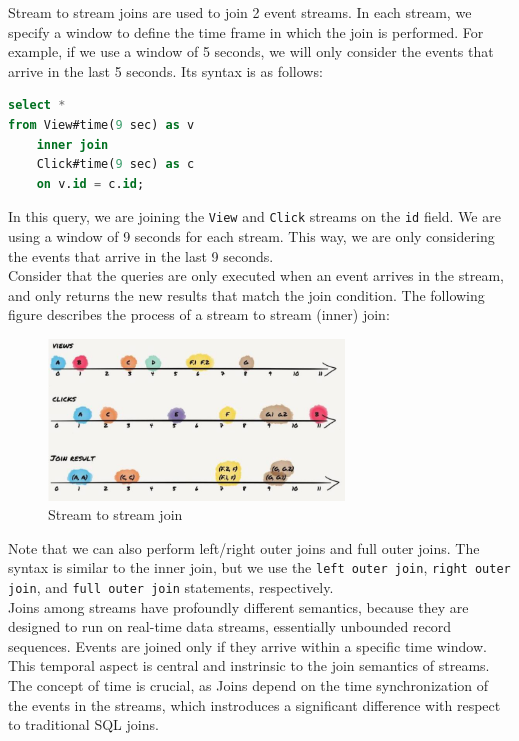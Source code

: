 Stream to stream joins are used to join 2 event streams. In each stream, we specify
a window to define the time frame in which the join is performed. For example,
if we use a window of 5 seconds, we will only consider the events that arrive in
the last 5 seconds. Its syntax is as follows:\\

\begin{lstlisting}[language=SQL]
select *
from View#time(9 sec) as v
    inner join
    Click#time(9 sec) as c
    on v.id = c.id;
\end{lstlisting}

In this query, we are joining the \texttt{View} and \texttt{Click} streams on the
\texttt{id} field. We are using a window of 9 seconds for each stream. This way,
we are only considering the events that arrive in the last 9 seconds.\\

Consider that the queries are only executed when an event arrives in the stream, 
and only returns the new results that match the join condition. The following figure 
describes the process of a stream to stream (inner) join:

\begin{figure}[H]
    \centering
    \includegraphics[width=0.7\textwidth]{figures/image_stream_stream_join.png}
    \caption{Stream to stream join}
    \label{fig:stream_stream_join}
\end{figure}

Note that we can also perform left/right outer joins and full outer joins. The
syntax is similar to the inner join, but we use the \texttt{left outer join},
\texttt{right outer join}, and \texttt{full outer join} statements, respectively.\\

Joins among streams have profoundly different semantics, because they are designed to
run on real-time data streams, essentially unbounded record sequences. Events are joined
only if they arrive within a specific time window. This temporal aspect is central and 
instrinsic to the join semantics of streams. The concept of time is crucial, as Joins
depend on the time synchronization of the events in the streams, which instroduces a 
significant difference with respect to traditional SQL joins.

